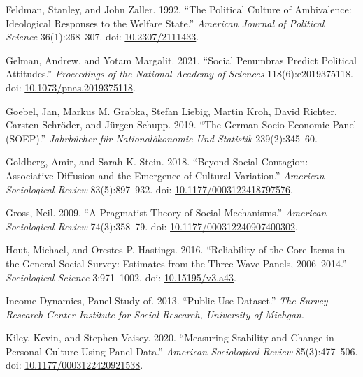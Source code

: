 \documentclass[
  12pt,
]{article}
\newlength{\cslhangindent}
\newlength{\cslentryspacingunit} %
\newenvironment{CSLReferences}[2] %
 {%
  \setlength{\parindent}{0pt}
  \ifodd #1
  \let\oldpar\par
  \def\par{\hangindent=\cslhangindent\oldpar}
  \fi
  \setlength{\parskip}{#2\cslentryspacingunit}
 }%
 {}
\begin{document}
\begin{CSLReferences}{1}{0}
\leavevmode{}%
Feldman, Stanley, and John Zaller. 1992. {``The {Political} {Culture} of
{Ambivalence}: {Ideological} {Responses} to the {Welfare} {State}.''}
\emph{American Journal of Political Science} 36(1):268--307. doi:
\href{https://doi.org/10.2307/2111433}{10.2307/2111433}.

\leavevmode{}%
Gelman, Andrew, and Yotam Margalit. 2021. {``Social Penumbras Predict
Political Attitudes.''} \emph{Proceedings of the National Academy of
Sciences} 118(6):e2019375118. doi:
\href{https://doi.org/10.1073/pnas.2019375118}{10.1073/pnas.2019375118}.

\leavevmode{}%
Goebel, Jan, Markus M. Grabka, Stefan Liebig, Martin Kroh, David
Richter, Carsten Schröder, and Jürgen Schupp. 2019. {``The German
Socio-Economic Panel (SOEP).''} \emph{Jahrb{ü}cher f{ü}r
National{ö}konomie Und Statistik} 239(2):345--60.

\leavevmode{}%
Goldberg, Amir, and Sarah K. Stein. 2018. {``Beyond {Social}
{Contagion}: {Associative} {Diffusion} and the {Emergence} of {Cultural}
{Variation}.''} \emph{American Sociological Review} 83(5):897--932. doi:
\href{https://doi.org/10.1177/0003122418797576}{10.1177/0003122418797576}.

\leavevmode{}%
Gross, Neil. 2009. {``A {Pragmatist} {Theory} of {Social}
{Mechanisms}.''} \emph{American Sociological Review} 74(3):358--79. doi:
\href{https://doi.org/10.1177/000312240907400302}{10.1177/000312240907400302}.

\leavevmode{}%
Hout, Michael, and Orestes P. Hastings. 2016. {``Reliability of the
{Core} {Items} in the {General} {Social} {Survey}: {Estimates} from the
{Three}-{Wave} {Panels}, 2006--2014.''} \emph{Sociological Science}
3:971--1002. doi:
\href{https://doi.org/10.15195/v3.a43}{10.15195/v3.a43}.

\leavevmode{}%
Income Dynamics, Panel Study of. 2013. {``Public Use Dataset.''}
\emph{The Survey Research Center Institute for Social Research,
University of Michgan}.

\leavevmode{}%
Kiley, Kevin, and Stephen Vaisey. 2020. {``Measuring {Stability} and
{Change} in {Personal} {Culture} {Using} {Panel} {Data}.''}
\emph{American Sociological Review} 85(3):477--506. doi:
\href{https://doi.org/10.1177/0003122420921538}{10.1177/0003122420921538}.


\end{CSLReferences}
\end{document}
